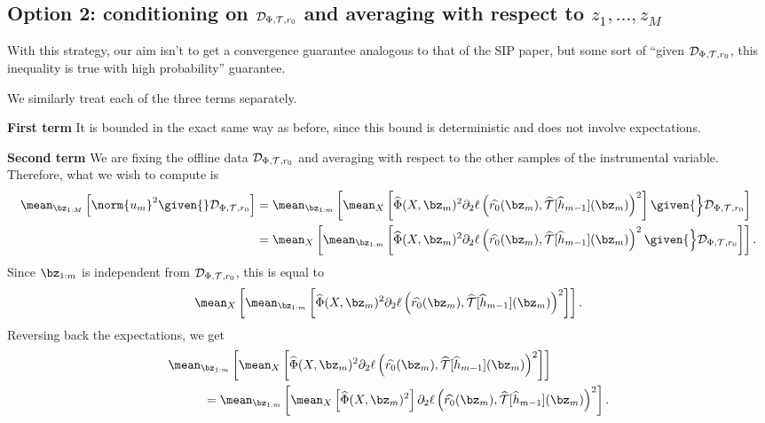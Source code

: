 \subsection{Option 2: conditioning on $ \mathcal{D}_{ \Phi, \mathcal{T}, r_{ 0 } } $ and averaging with respect to $ z_{ 1 } , \dots, z_{ M } $}

With this strategy, our aim isn't to get a convergence guarantee analogous to that of the SIP paper, but some sort of ``given $ \mathcal{D}_{ \Phi, \mathcal{T}, r_{ 0 } } $, this inequality is true with high probability'' guarantee.

We similarly treat each of the three terms separately.

\textbf{First term }
It is bounded in the exact same way as before, since this bound is deterministic and does not involve expectations.

\textbf{Second term }
We are fixing the offline data $ \mathcal{D}_{ \Phi, \mathcal{T}, r_{ 0 } } $ and averaging with respect to the other samples of the instrumental variable.
Therefore, what we wish to compute is
\begin{align*}
    \mean_{ \bz_{ 1:M } } \left[
        \norm{ u_{ m } }^2
        \given{} \dataoff
    \right]
    &= \mean_{ \bz_{ 1:m } } \left[
        \mean_{ X } \left[
            \hat{ \Phi } ( X, \bz_{ m } )^2
            \partial_{ 2 } \ell \left(
                \hat{ r_{ 0 } } ( \bz_{ m } ),
                \hat{ \mathcal{T} } [ \hat{ h }_{ m-1 } ] ( \bz_{ m } )
            \right)^2
        \right]
        \given{\Big} \dataoff
    \right] \\
    &= \mean_{ X } \left[
        \mean_{ \bz_{ 1:m } } \left[
            \hat{ \Phi } ( X, \bz_{ m } )^2
            \partial_{ 2 } \ell \left(
                \hat{ r_{ 0 } } ( \bz_{ m } ),
                \hat{ \mathcal{T} } [ \hat{ h }_{ m-1 } ] ( \bz_{ m } )
            \right)^2
            \given{\Big} \dataoff
        \right]
    \right]
.\end{align*}
Since $ \bz_{ 1:m } $ is independent from $ \mathcal{D}_{ \Phi, \mathcal{T}, r_{ 0 } } $, this is equal to
\begin{equation*}
    \mean_{ X } \left[
        \mean_{ \bz_{ 1:m } } \left[
            \hat{ \Phi } ( X, \bz_{ m } )^2
            \partial_{ 2 } \ell \left(
                \hat{ r_{ 0 } } ( \bz_{ m } ),
                \hat{ \mathcal{T} } [ \hat{ h }_{ m-1 } ] ( \bz_{ m } )
            \right)^2
        \right]
    \right]
.\end{equation*}
Reversing back the expectations, we get
\begin{align*}
    &\mean_{ \bz_{ 1:m } } \left[
        \mean_{ X } \left[
            \hat{ \Phi } ( X, \bz_{ m } )^2
            \partial_{ 2 } \ell \left(
                \hat{ r_{ 0 } } ( \bz_{ m } ),
                \hat{ \mathcal{T} } [ \hat{ h }_{ m-1 } ] ( \bz_{ m } )
            \right)^2
        \right]
    \right] \\
    &\hspace{1cm}=
    \mean_{ \bz_{ 1:m } } \left[
        \mean_{ X } \left[
            \hat{ \Phi } ( X, \bz_{ m } )^2
        \right]
        \partial_{ 2 } \ell \left(
            \hat{ r_{ 0 } } ( \bz_{ m } ),
            \hat{ \mathcal{T} } [ \hat{ h }_{ m-1 } ] ( \bz_{ m } )
        \right)^2
    \right]
.\end{align*}

